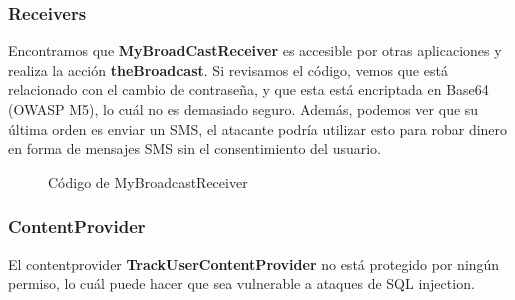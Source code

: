 \documentclass[12pt,twoside]{article}
\begin{document}
\subsubsection{Receivers}
Encontramos que \textbf{MyBroadCastReceiver} es accesible por otras aplicaciones y realiza la acción \textbf{theBroadcast}. Si revisamos el código, vemos que está relacionado con el cambio de contraseña, y que esta está encriptada en Base64 (OWASP M5), lo cuál no es demasiado seguro. Además, podemos ver que su última orden es enviar un SMS, el atacante podría utilizar esto para robar dinero en forma de mensajes SMS sin el consentimiento del usuario.
\begin{figure}[H]
    \centering
    \caption{Código de MyBroadcastReceiver}
\end{figure}

\subsubsection{ContentProvider}
El contentprovider \textbf{TrackUserContentProvider} no está protegido por ningún permiso, lo cuál puede hacer que sea vulnerable a ataques de SQL injection. 
\end{document}
